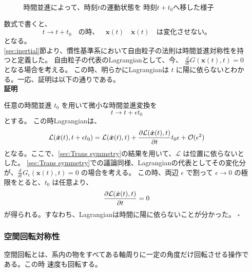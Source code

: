 \documentclass[a4paper,11pt]{ltjsarticle}
\newcommand{\La}{\mathcal{L}}
\begin{document}
\begin{figure}[ht]

\caption{時間並進によって、時刻$t$の運動状態を
時刻$t+t_0$へ移した様子}
\label{fig:time-translation}
\end{figure}

数式で書くと、
\[
t\rightarrow t+t_0 \quad の時、 \quad \bm{x}(t)\quad \dot{\bm{x}}(t) \quad は変化させない。 
\]
となる。
\\\ref{sec:inertial}節より、慣性基準系において自由粒子の法則は時間並進対称性を持つと定義した。
自由粒子の代表のLagrangianとして、今、 $\frac{d}{dt}G(\bm{x}(t),t)=0$ となる場合を考える。
この時、明らかにLagrangianは $t$ に陽に依らないとわかる。一応、証明は以下の通りである。
\\\textbf{証明}

任意の時間並進 $t_0$ を用いて微小な時間並進変換を
\[
t\rightarrow t+\epsilon t_0
\]
とする。
この時Lagrangianは、
\[
\La(\dot{\bm{x}}(t),t+\epsilon t_0)=\La(\dot{\bm{x}}(t),t)+\pdv{\La(\dot{\bm{x}}(t),t)}{t}t_0\epsilon+\mathcal{O}(\epsilon^2)
\]
となる。ここで、\ref{sec:Trans symmetry}の結果を用いて、$\La$ は位置に依らないとした。
\ref{sec:Trans symmetry}での議論同様、Lagrangianの代表としてその変化分が、$\frac{d}{dt}G_\epsilon(\bm{x}(t),t)=0$ の場合を考える。
この時、両辺 $\epsilon$ で割って $\epsilon \rightarrow 0$ の極限をとると、$t_0$ は任意より、
\[
\pdv{\La(\dot{\bm{x}}(t),t)}{t}=0
\]
が得られる。すなわち、Lagrangianは時間に陽に依らないことが分かった。 $\square$

\subsubsection{空間回転対称性}
空間回転とは、系内の物をすべてある軸周りに一定の角度だけ回転させる操作である。この時
速度も回転する。
\end{document}
